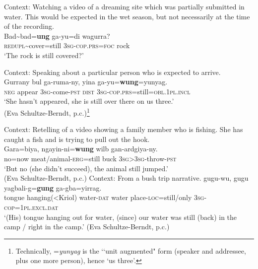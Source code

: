 \begin{exe}
	\ex\label{exAppendixJaminjung1}
	Context: Watching a video of a dreaming site which was partially submitted in water. This would be expected in the wet season, but not necessarily at the time of the recording.\\
	\gll Bad\sim bad=\textbf{ung} ga-yu=di wagurra?\\
	\textsc{redupl}\sim cover=still 3\textsc{sg}-\textsc{cop}.\textsc{prs}=\textsc{foc} rock\\
	\glt \lq The rock is still covered?' \parencite[234]{SchultzeBerndt2002}

	\ex\label{exAppendixJaminjung2}
	Context: Speaking about a particular person who is expected to arrive.\\
	\gll Gurrany bul ga-ruma-ny, yina ga-yu=\textbf{wung}=yunyag.\\
	\textsc{neg} appear 3\textsc{sg}-come-\textsc{pst} \textsc{dist} 3\textsc{sg}-\textsc{cop}.\textsc{prs}=still=\textsc{obl}.1\textsc{pl}.\textsc{incl}\\
	\glt \lq She hasn't appeared, she is still over there on us three.'
	\\(Eva Schultze-Berndt, p.c.)\footnote{Technically, \mbox{=\textit{yunyag}} is the \lq\lq unit augmented" form (speaker and addressee, plus one more person), hence \lq us three'.}
	
	\ex\label{exAppendixJaminjung3}
	Context: Retelling of a video showing a family member who is fishing. She has caught a fish and is trying to pull out the hook.\\
	\gll Gara=biya, ngayin-ni=\textbf{wung} wilb gan-ardgiya-ny.\\
	no=now meat/animal-\textsc{erg}=still buck 3\textsc{sg}>3\textsc{sg}-throw-\textsc{pst}\\
	\glt \lq But no (she didn't succeed), the animal still jumped.'
	\\(Eva Schultze-Berndt, p.c.)
	\pagebreak
	\ex\label{exAppendixJaminjung4}
	Context: From a bush trip narrative.
\exi{} gugu-wu, gugu yagbali-g=\textbf{gung} ga-gba=yirrag.\\
{tongue hanging(<Kriol)} water-\textsc{dat} water place-\textsc{loc}=still/only 3\textsc{sg}-\textsc{cop}=1\textsc{pl}.\textsc{excl}.\textsc{dat}\\
\glt \lq (His) tongue hanging out for water, (since) our water was still (back) in the camp / right in the camp.' (Eva Schultze-Berndt, p.c.)
\end{exe}

